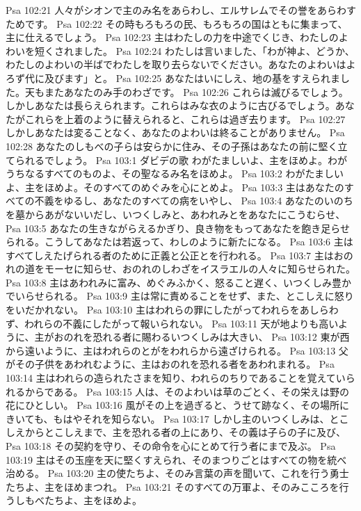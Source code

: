 Psa 102:21  人々がシオンで主のみ名をあらわし、エルサレムでその誉をあらわすためです。
Psa 102:22  その時もろもろの民、もろもろの国はともに集まって、主に仕えるでしょう。
Psa 102:23  主はわたしの力を中途でくじき、わたしのよわいを短くされました。
Psa 102:24  わたしは言いました、「わが神よ、どうか、わたしのよわいの半ばでわたしを取り去らないでください。あなたのよわいはよろず代に及びます」と。
Psa 102:25  あなたはいにしえ、地の基をすえられました。天もまたあなたのみ手のわざです。
Psa 102:26  これらは滅びるでしょう。しかしあなたは長らえられます。これらはみな衣のように古びるでしょう。あなたがこれらを上着のように替えられると、これらは過ぎ去ります。
Psa 102:27  しかしあなたは変ることなく、あなたのよわいは終ることがありません。
Psa 102:28  あなたのしもべの子らは安らかに住み、その子孫はあなたの前に堅く立てられるでしょう。
Psa 103:1  ダビデの歌 わがたましいよ、主をほめよ。わがうちなるすべてのものよ、その聖なるみ名をほめよ。
Psa 103:2  わがたましいよ、主をほめよ。そのすべてのめぐみを心にとめよ。
Psa 103:3  主はあなたのすべての不義をゆるし、あなたのすべての病をいやし、
Psa 103:4  あなたのいのちを墓からあがないいだし、いつくしみと、あわれみとをあなたにこうむらせ、
Psa 103:5  あなたの生きながらえるかぎり、良き物をもってあなたを飽き足らせられる。こうしてあなたは若返って、わしのように新たになる。
Psa 103:6  主はすべてしえたげられる者のために正義と公正とを行われる。
Psa 103:7  主はおのれの道をモーセに知らせ、おのれのしわざをイスラエルの人々に知らせられた。
Psa 103:8  主はあわれみに富み、めぐみふかく、怒ること遅く、いつくしみ豊かでいらせられる。
Psa 103:9  主は常に責めることをせず、また、とこしえに怒りをいだかれない。
Psa 103:10  主はわれらの罪にしたがってわれらをあしらわず、われらの不義にしたがって報いられない。
Psa 103:11  天が地よりも高いように、主がおのれを恐れる者に賜わるいつくしみは大きい、
Psa 103:12  東が西から遠いように、主はわれらのとがをわれらから遠ざけられる。
Psa 103:13  父がその子供をあわれむように、主はおのれを恐れる者をあわれまれる。
Psa 103:14  主はわれらの造られたさまを知り、われらのちりであることを覚えていられるからである。
Psa 103:15  人は、そのよわいは草のごとく、その栄えは野の花にひとしい。
Psa 103:16  風がその上を過ぎると、うせて跡なく、その場所にきいても、もはやそれを知らない。
Psa 103:17  しかし主のいつくしみは、とこしえからとこしえまで、主を恐れる者の上にあり、その義は子らの子に及び、
Psa 103:18  その契約を守り、その命令を心にとめて行う者にまで及ぶ。
Psa 103:19  主はその玉座を天に堅くすえられ、そのまつりごとはすべての物を統べ治める。
Psa 103:20  主の使たちよ、そのみ言葉の声を聞いて、これを行う勇士たちよ、主をほめまつれ。
Psa 103:21  そのすべての万軍よ、そのみこころを行うしもべたちよ、主をほめよ。
